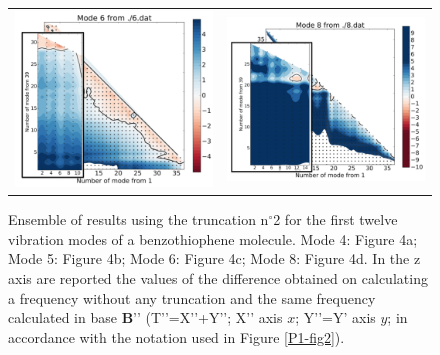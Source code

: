 \begin{figure}[H]
\begin{center}
\begin{tabular}{c c}
				\includegraphics[scale=0.2]{image/image/P1-43} & \includegraphics[scale=0.2]{image/image/P1-44}\\
			\end{tabular}
		\end{center}
		\caption[Ensemble of results using the truncation n$^{\circ}$2 for the first twelve vibration modes of a benzothiophene molecule]{Ensemble of results using the truncation n$^{\circ}$2 for the first twelve vibration modes of a benzothiophene molecule. Mode 4: Figure 4a; Mode 5: Figure 4b; Mode 6: Figure 4c;  Mode 8: Figure 4d.
			In the z axis are reported the values of the difference obtained on calculating a frequency without any truncation and the same frequency calculated in base $\textbf{B’’}$ (T’’=X’’+Y’’; X’’ axis $x$; Y’’=Y’ axis $y$; in accordance with the notation used in Figure \ref{P1-fig2}).}
	\end{figure}
	
